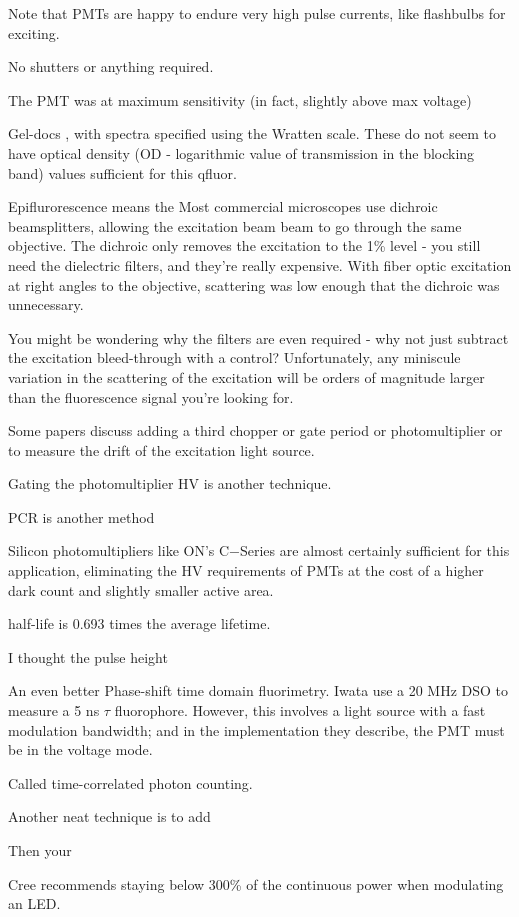 \documentclass[paper.tex]{subfiles}
\begin{document}
Note that PMTs are happy to endure very high pulse currents, like flashbulbs for exciting. 


No shutters or anything required. 


The PMT was at maximum sensitivity (in fact, slightly above max voltage)

Gel-docs , with spectra specified using the Wratten scale. These do not seem to have optical density (OD - logarithmic value of transmission in the blocking band) values sufficient for this qfluor. 

Epiflurorescence means the Most commercial microscopes use dichroic beamsplitters, allowing the excitation beam beam to go through the same objective. The dichroic only removes the excitation to the 1\% level - you still need the dielectric filters, and they’re really expensive. With fiber optic excitation at right angles to the objective, scattering was low enough that the dichroic was unnecessary. 

You might be wondering why the filters are even required - why not just subtract the excitation bleed-through with a control? Unfortunately, any miniscule variation in the scattering of the excitation will be orders of magnitude larger than the fluorescence signal you’re looking for.

Some papers discuss adding a third chopper or gate period or photomultiplier or to measure the drift of the excitation light source.

Gating the photomultiplier HV is another technique.

PCR is another method


Silicon photomultipliers like ON's C−Series are almost certainly sufficient for this application, eliminating the HV requirements of PMTs at the cost of a higher dark count and slightly smaller active area.

half-life is 0.693 times the average lifetime. 


I thought the pulse height

An even better Phase-shift time domain fluorimetry. Iwata use a 20 MHz DSO to measure a 5 ns $\tau$ fluorophore. However, this involves a light source with a fast modulation bandwidth; and in the implementation they describe, the PMT must be in the voltage mode.

Called time-correlated photon counting.

Another neat technique is to add

Then your 

Cree recommends staying below 300\% of the continuous power when modulating an LED.
\end{document}
